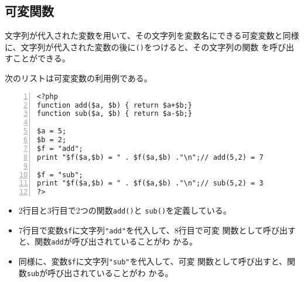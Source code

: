 \subsection{可変関数}
文字列が代入された変数を用いて、その文字列を変数名にできる可変変数と同様
に、文字列が代入された変数の後に\texttt{()}をつけると、その文字列の関数
を呼び出すことができる。
\begin{Exec}\upshape
次のリストは可変変数の利用例である。
\begin{Verbatim}[numbers=left]
<?php
function add($a, $b) { return $a+$b;}
function sub($a, $b) { return $a-$b;}

$a = 5;
$b = 2;
$f = "add";
print "$f($a,$b) = " . $f($a,$b) ."\n";// add(5,2) = 7

$f = "sub";
print "$f($a,$b) = " . $f($a,$b) ."\n";// sub(5,2) = 3
?>
\end{Verbatim}
\begin{itemize}\upshape
 \item 2行目と3行目で2つの関数\texttt{add()}と
       \texttt{sub()}を定義している。
 \item 7行目で変数\Verb+$f+に文字列\Verb+"add"+を代入して、8行目で可変
       関数として呼び出すと、関数\texttt{add}が呼び出されていることがわ
       かる。
 \item 同様に、変数\Verb+$f+に文字列\Verb+"sub"+を代入して、可変
       関数として呼び出すと、関数\texttt{sub}が呼び出されていることがわ
       かる。
\end{itemize}
\end{Exec}
